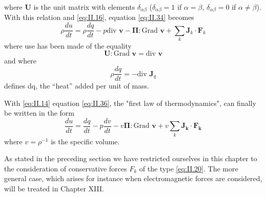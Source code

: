 where $\bm{U}$ is the unit matrix with elements $\delta_{\alpha \beta}$ ($\delta_{\alpha \beta} = 1$ if $\alpha = \beta$, $\delta_{\alpha \beta} = 0$ if $\alpha \neq \beta$). With this relation and \eqref{eq:II.16}, equation \eqref{eq:II.34} becomes
\begin{equation}
\rho \frac{d u}{d t} = \rho \frac{d q}{d t} - p \textrm{div } \bm{v} - \bm{\Pi} : \textrm{Grad } \bm{v} + \sum_k \bm{J}_k \cdot \bm{F}_k
    \label{eq:II.36}
\end{equation}
where use has been made of the equality
\begin{equation}
\bm{U} : \textrm{Grad } \bm{v} = \textrm{div } \bm{v}
    \label{eq:II.37}
\end{equation}
and where
\begin{equation}
\rho \frac{d q}{d t} = - \textrm{div } \bm{J}_q
    \label{eq:II.38}
\end{equation}
defines dq, the ``heat'' added per unit of mass.

With \eqref{eq:II.14} equation \eqref{eq:II.36}, the "first law of thermodynamics", can finally be written in the form
\begin{equation}
    \frac{d u}{d t} = \frac{d q}{d t} - p \frac{d v}{d t} - v \bm{\Pi} : \textrm{Grad } \bm{v} + v \sum_k \bm{J_k \cdot \bm{F}_k}
    \label{eq:II.39}
\end{equation}
where $v = \rho^{-1}$ is the specific volume.

As stated in the preceding section we have restricted ourselves in
this chapter to the consideration of conservative forces $F_k$ of the type \eqref{eq:II.20}. The more general case, which arises for instance when electromagnetic forces are considered, will be treated in Chapter XIII.
